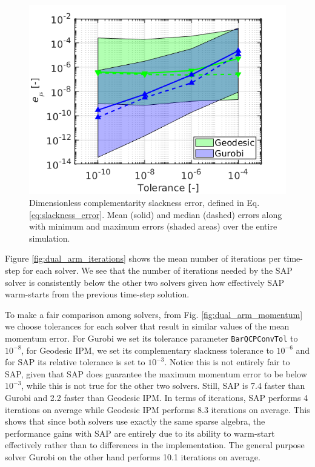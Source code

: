 \begin{figure}[!h]
	\centering
    \includegraphics[width=0.7\columnwidth]{figures/dual_arm/optimality_condition.png}
    \caption{\label{fig:dual_arm_slackness} Dimensionless complementarity
    slackness error, defined in Eq. \eqref{eq:slackness_error}. Mean (solid) and
    median (dashed) errors along with minimum and maximum errors (shaded areas)
    over the entire simulation.}
\end{figure}

Figure \ref{fig:dual_arm_iterations} shows the mean number of iterations per
time-step for each solver. We see that the number of iterations needed by the
SAP solver is consistently below the other two solvers given how effectively SAP
warm-starts from the previous time-step solution.

To make a fair comparison among solvers, from Fig. \ref{fig:dual_arm_momentum}
we choose tolerances for each solver that result in similar values of the mean
momentum error. For Gurobi we set its tolerance parameter \verb+BarQCPConvTol+
to $10^{-8}$, for Geodesic IPM, we set its complementary slackness tolerance to
$10^{-6}$ and for SAP its relative tolerance is set to $10^{-3}$. Notice this is
not entirely fair to SAP, given that SAP does guarantee the maximum momentum
error to be below $10^{-3}$, while this is not true for the other two solvers.
Still, SAP is 7.4 faster than Gurobi and 2.2 faster than Geodesic IPM. In terms
of iterations, SAP performs 4 iterations on average while Geodesic IPM performs
8.3 iterations on average. This shows that since both solvers use exactly the
same sparse algebra, the performance gains with SAP are entirely due to its
ability to warm-start effectively rather than to differences in the
implementation. The general purpose solver Gurobi on the other hand performs
10.1 iterations on average.

